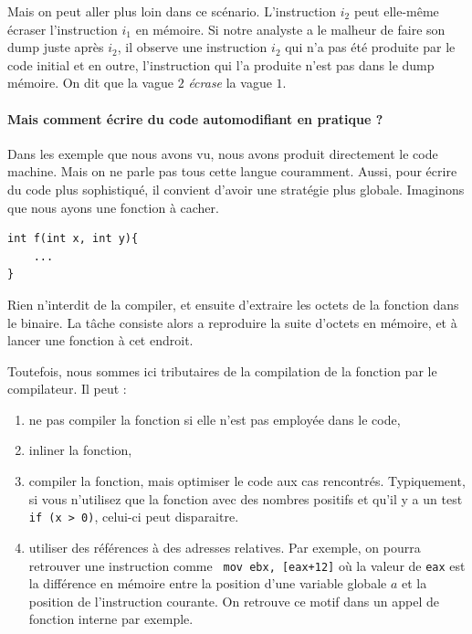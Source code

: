 \documentclass{book}
\begin{document}
Mais on peut aller plus loin dans ce scénario. L'instruction $i_2$ peut elle-même écraser l'instruction $i_1$ en mémoire. Si notre analyste a le malheur de faire son dump juste après $i_2$, il observe une instruction $i_2$ qui n'a pas été produite par le code initial et en outre, l'instruction qui l'a produite n'est pas dans le dump mémoire. On dit que la vague $2$ \emph{écrase} la vague $1$.


\paragraph{Mais comment écrire du code automodifiant  en pratique ?}

Dans les exemple que nous avons vu, nous avons produit directement le code machine. Mais on ne parle pas tous cette langue couramment. Aussi, pour écrire du code plus sophistiqué, il convient d'avoir une stratégie plus globale. Imaginons que nous ayons une fonction à cacher. 

\begin{verbatim}
int f(int x, int y){
	...
}
\end{verbatim}

Rien n'interdit de la compiler, et ensuite d'extraire les octets de la fonction dans le binaire. La tâche consiste alors a reproduire la suite d'octets en mémoire, et à lancer une fonction à cet endroit. 

Toutefois, nous sommes ici tributaires de la compilation de la fonction par le compilateur. Il peut :
\begin{enumerate}
\item ne pas compiler la fonction si elle n'est pas employée dans le code,
\item inliner la fonction,
\item compiler la fonction, mais optimiser le code aux cas rencontrés. Typiquement, si vous n'utilisez que la fonction avec des nombres positifs et qu'il y a un test \texttt{if (x > 0)}, celui-ci peut disparaitre. 
\item utiliser des références à des adresses relatives. Par exemple, on pourra retrouver une instruction comme \texttt{ mov ebx, [eax+12]} où la valeur de {\tt eax} est la différence en mémoire entre la position d'une variable globale $a$ et la position de l'instruction courante. On retrouve ce motif dans un appel de fonction interne par exemple.
\end{enumerate}
\end{document}
